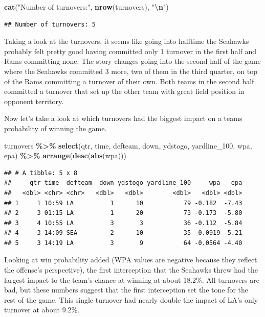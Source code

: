 \documentclass[
]{article}
\newenvironment{Shaded}{\begin{snugshade}}{\end{snugshade}}
\newcommand{\FunctionTok}[1]{\textcolor[rgb]{0.13,0.29,0.53}{\textbf{#1}}}
\newcommand{\NormalTok}[1]{#1}
\newcommand{\SpecialCharTok}[1]{\textcolor[rgb]{0.81,0.36,0.00}{\textbf{#1}}}
\newcommand{\StringTok}[1]{\textcolor[rgb]{0.31,0.60,0.02}{#1}}
\begin{document}
\begin{Shaded}
\begin{Highlighting}[]
\FunctionTok{cat}\NormalTok{(}\StringTok{"Number of turnovers:"}\NormalTok{, }\FunctionTok{nrow}\NormalTok{(turnovers), }\StringTok{"}\SpecialCharTok{\textbackslash{}n}\StringTok{"}\NormalTok{)}
\end{Highlighting}
\end{Shaded}

\begin{verbatim}
## Number of turnovers: 5
\end{verbatim}

Taking a look at the turnovers, it seems like going into halftime the
Seahawks probably felt pretty good having committed only 1 turnover in
the first half and Rams committing none. The story changes going into
the second half of the game where the Seahawks committed 3 more, two of
them in the third quarter, on top of the Rams committing a turnover of
their own. Both teams in the second half committed a turnover that set
up the other team with great field position in opponent territory.

Now let's take a look at which turnovers had the biggest impact on a
teams probability of winning the game.

\begin{Shaded}
\begin{Highlighting}[]
\NormalTok{turnovers }\SpecialCharTok{\%\textgreater{}\%} 
     \FunctionTok{select}\NormalTok{(qtr, time, defteam, down, ydstogo, yardline\_100, wpa, epa) }\SpecialCharTok{\%\textgreater{}\%}
     \FunctionTok{arrange}\NormalTok{(}\FunctionTok{desc}\NormalTok{(}\FunctionTok{abs}\NormalTok{(wpa)))}
\end{Highlighting}
\end{Shaded}

\begin{verbatim}
## # A tibble: 5 x 8
##     qtr time  defteam  down ydstogo yardline_100     wpa   epa
##   <dbl> <chr> <chr>   <dbl>   <dbl>        <dbl>   <dbl> <dbl>
## 1     1 10:59 LA          1      10           79 -0.182  -7.43
## 2     3 01:15 LA          1      20           73 -0.173  -5.80
## 3     4 10:55 LA          3       3           36 -0.112  -5.84
## 4     3 14:09 SEA         2      10           35 -0.0919 -5.21
## 5     3 14:19 LA          3       9           64 -0.0564 -4.40
\end{verbatim}

Looking at win probability added (WPA values are negative because they
reflect the offense's perspective), the first interception that the
Seahawks threw had the largest impact to the team's chance at winning at
about 18.2\%. All turnovers are bad, but these numbers suggest that the
first interception set the tone for the rest of the game. This single
turnover had nearly double the impact of LA's only turnover at about
9.2\%.
\end{document}
